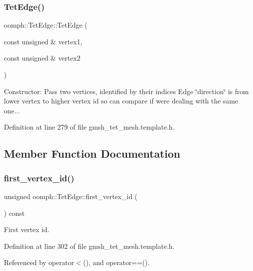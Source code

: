 \subsubsection{\texorpdfstring{Tet\+Edge()}{TetEdge()}}
{\footnotesize\ttfamily oomph\+::\+Tet\+Edge\+::\+Tet\+Edge (\begin{DoxyParamCaption}\item[{const unsigned \&}]{vertex1,  }\item[{const unsigned \&}]{vertex2 }\end{DoxyParamCaption})\hspace{0.3cm}{\ttfamily [inline]}}



Constructor\+: Pass two vertices, identified by their indices Edge \char`\"{}direction\char`\"{} is from lower vertex to higher vertex id so can compare if we\textquotesingle{}re dealing with the same one... 



Definition at line 279 of file gmsh\+\_\+tet\+\_\+mesh.\+template.\+h.



\subsection{Member Function Documentation}
\mbox{\label{classoomph_1_1TetEdge_acc26fa59e15615e1620fade6f9d1bbe1}} 
\subsubsection{\texorpdfstring{first\+\_\+vertex\+\_\+id()}{first\_vertex\_id()}}
{\footnotesize\ttfamily unsigned oomph\+::\+Tet\+Edge\+::first\+\_\+vertex\+\_\+id (\begin{DoxyParamCaption}{ }\end{DoxyParamCaption}) const\hspace{0.3cm}{\ttfamily [inline]}}



First vertex id. 



Definition at line 302 of file gmsh\+\_\+tet\+\_\+mesh.\+template.\+h.



Referenced by operator$<$(), and operator==().

